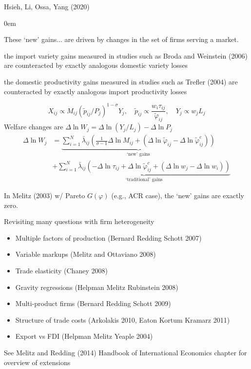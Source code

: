 \documentclass[10pt,notes=hide]{beamer}
\begin{document}
\begin{frame}{Hsieh, Li, Ossa, Yang (2020)}
\begin{itemize}\itemsep0em{\footnotesize
\item 
These `new' gains... are driven by changes in the set of firms serving a market.
\item
the import variety gains measured in studies such as Broda and Weinstein (2006) are counteracted by exactly analogous domestic variety losses
\item
the domestic productivity gains measured in studies such as Trefler (2004) are counteracted by exactly analogous import productivity losses\par
}\end{itemize}
$$
X_{ij} \propto M_{ij} \left(\tilde{p}_{ij}/P_j\right)^{1-\sigma} Y_j, \quad
\tilde{p}_{ij} \propto \frac{w_i \tau_{ij}}{\tilde{\varphi}_{ij}}, \quad
Y_j \propto w_j L_j
$$
Welfare changes are $\Delta \ln W_j = \Delta \ln \left(Y_j / L_j\right) - \Delta \ln P_j$
\begin{align*}
\Delta \ln W_j
&=
\underbrace{
\sum_{i=1}^{N} \bar{\lambda}_{ij} \left(\frac{1}{\sigma-1} \Delta \ln M_{ij} + \left(\Delta \ln \tilde{\varphi}_{ij} - \Delta \ln \tilde{\varphi}^{c}_{ij}\right) \right)
}_{\text{`new' gains}}
\\&+
\underbrace{
\sum_{i=1}^{N} \bar{\lambda}_{ij} \left(- \Delta \ln \tau_{ij} + \Delta \ln \tilde{\varphi}^{c}_{ij} + \left(\Delta \ln w_j - \Delta \ln w_i \right) \right)
}_{\text{`traditional' gains}}
\end{align*}
\footnotesize{In Melitz (2003) w/ Pareto $G(\varphi)$ (e.g., ACR case), the `new' gains are exactly zero.\par}
\end{frame}
\begin{frame}{Revisiting many questions with firm heterogeneity }
\begin{itemize}
\item Multiple factors of production (Bernard Redding Schott 2007)
\item Variable markups (Melitz and Ottaviano 2008)
\item Trade elasticity (Chaney 2008)
\item Gravity regressions (Helpman Melitz Rubinstein 2008)
\item Multi-product firms (Bernard Redding Schott 2009)
\item Structure of trade costs (Arkolakis 2010, Eaton Kortum Kramarz 2011)
\item Export vs FDI (Helpman Melitz Yeaple 2004)
\end{itemize}
See Melitz and Redding (2014) Handbook of International Economics chapter for overview of extensions
\end{frame}
\end{document}
